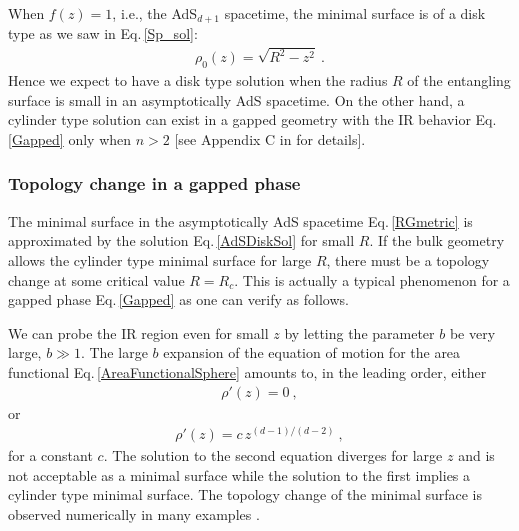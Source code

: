 When $f(z)=1$, i.e., the AdS$_{d+1}$ spacetime, the minimal surface is of a disk type as we saw in Eq.\,\eqref{Sp_sol}:
\begin{align}\label{AdSDiskSol}
\rho_0(z) = \sqrt{R^2 - z^2} \ .
\end{align}
Hence we expect to have a disk type solution when the radius $R$ of the entangling surface is small in an asymptotically AdS spacetime.
On the other hand, a cylinder type solution can exist in a gapped geometry with the IR behavior Eq.\,\eqref{Gapped} only when $n>2$ [see Appendix C in \cite{Liu:2012eea} for details].


\subsubsection{Topology change in a gapped phase} 
The minimal surface in the asymptotically AdS spacetime Eq.\,\eqref{RGmetric} is approximated by the solution Eq.\,\eqref{AdSDiskSol} for small $R$.
If the bulk geometry allows the cylinder type minimal surface for large $R$, there must be a topology change at some critical value $R=R_c$.
This is actually a typical phenomenon for a gapped phase Eq.\,\eqref{Gapped} as one can verify as follows.

We can probe the IR region even for small $z$ by letting the parameter $b$ be very large, $b\gg 1$.
The large $b$ expansion of the equation of motion for the area functional Eq.\,\eqref{AreaFunctionalSphere} amounts to, in the leading order, either 
\begin{align}
	\rho'(z)=0 \ , 
\end{align}
or 
\begin{align}
	\rho'(z) = c\, z^{(d-1)/(d-2)} \ ,
\end{align}
for a constant $c$.
The solution to the second equation diverges for large $z$ and is not acceptable as a minimal surface
while the solution to the first implies a cylinder type minimal surface.
The topology change of the minimal surface is observed numerically in many examples \cite{Liu:2012eea,Klebanov:2012yf,Liu:2013una}.

